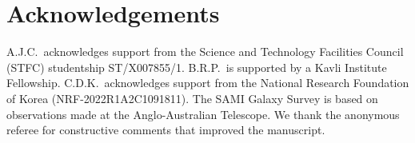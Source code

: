 \section*{Acknowledgements}

A.J.C.\ acknowledges support from the Science and Technology
Facilities Council (STFC) studentship ST/X007855/1.
B.R.P.\ is supported by a Kavli Institute Fellowship.
C.D.K.\ acknowledges support from the National Research Foundation
of Korea (NRF-2022R1A2C1091811).
The SAMI Galaxy Survey is based on observations made at the
Anglo-Australian Telescope.
We thank the anonymous referee for constructive comments that
improved the manuscript.

